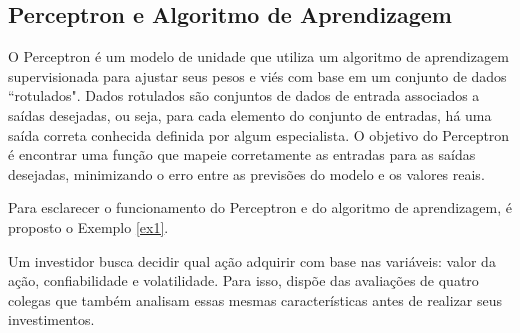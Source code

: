 \subsection{Perceptron e Algoritmo de Aprendizagem}
O Perceptron é um modelo de unidade que utiliza um algoritmo de aprendizagem supervisionada para ajustar seus pesos e viés com base em um conjunto de dados ``rotulados". Dados rotulados são conjuntos de dados de entrada associados a saídas desejadas, ou seja, para cada elemento do conjunto de entradas, há uma saída correta conhecida definida por algum especialista. O objetivo do Perceptron é encontrar uma função que mapeie corretamente as entradas para as saídas desejadas, minimizando o erro entre as previsões do modelo e os valores reais.

Para esclarecer o funcionamento do Perceptron e do algoritmo de aprendizagem, é proposto o Exemplo \ref{ex1}.

\begin{exemplo}
\label{ex1}
Um investidor busca decidir qual ação adquirir com base nas variáveis: valor da ação, confiabilidade e volatilidade. Para isso, dispõe das avaliações de quatro colegas que também analisam essas mesmas características antes de realizar seus investimentos.
\end{exemplo}

